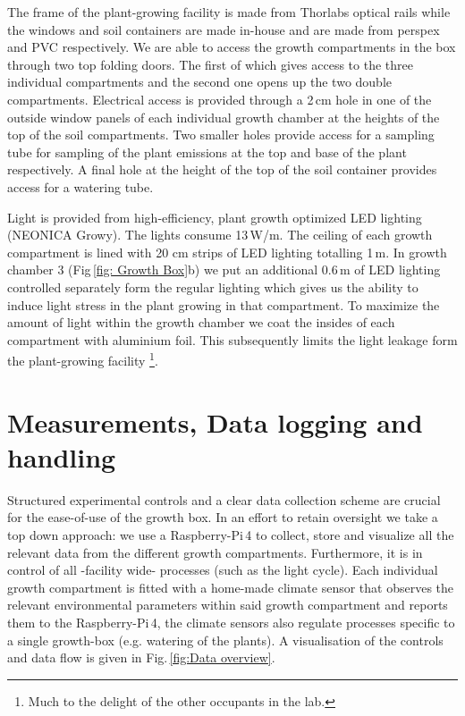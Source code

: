 \documentclass[reprint,superscriptaddress,aps,amsmath,amssymb]{revtex4-1}
\begin{document}
The frame of the plant-growing facility is made from Thorlabs optical rails while the windows and soil containers are made in-house and are made from perspex and PVC respectively.
We are able to access the growth compartments in the box through two top folding doors. The first of which gives access to the three individual compartments and the second one opens up the two double compartments. Electrical access is provided through a 2\,cm hole in one of the outside window panels of each individual growth chamber at the heights of the top of the soil compartments. Two smaller holes provide access for a sampling tube for sampling of the plant emissions at the top and base of the plant respectively. A final hole at the height of the top of the soil container provides access for a watering tube.

Light is provided from high-efficiency, plant growth optimized LED lighting (NEONICA Growy). The lights consume 13\,W/m. The ceiling of each growth compartment is lined with 20 cm strips of LED lighting totalling 1\,m. In growth chamber 3 (Fig\,\ref{fig: Growth Box}b) we put an additional 0.6\,m of LED lighting controlled separately form the regular lighting which gives us the ability to induce light stress in the plant growing in that compartment. To maximize the amount of light within the growth chamber we coat the insides of each compartment with aluminium foil. This subsequently limits the light leakage form the plant-growing facility \footnote{Much to the delight of the other occupants in the lab.}.

\section{Measurements, Data logging and handling}
Structured experimental controls and a clear data collection scheme are crucial for the ease-of-use of the growth box. In an effort to retain oversight we take a top down approach: we use a Raspberry-Pi\,4 to collect, store and visualize all the relevant data from the different growth compartments. Furthermore, it is in control of all -facility wide- processes (such as the light cycle). Each individual growth compartment is fitted with a home-made climate sensor that observes the relevant environmental parameters within said growth compartment and reports them to the Raspberry-Pi\,4, the climate sensors also regulate processes specific to a single growth-box (e.g. watering of the plants). A visualisation of the controls and data flow is given in Fig.\,\ref{fig:Data overview}.
\end{document}
